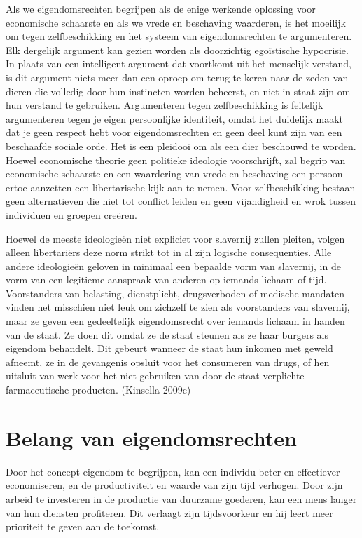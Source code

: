 \documentclass[
  a5paper,
  smalldemyvopaper,11pt,twoside,onecolumn,openright,extrafontsizes,
hidelinks]{memoir}
\begin{document}
Als we eigendomsrechten begrijpen als de enige werkende oplossing voor
economische schaarste en als we vrede en beschaving waarderen, is het
moeilijk om tegen zelfbeschikking en het systeem van eigendomsrechten te
argumenteren. Elk dergelijk argument kan gezien worden als doorzichtig
egoïstische hypocrisie. In plaats van een intelligent argument dat
voortkomt uit het menselijk verstand, is dit argument niets meer dan een
oproep om terug te keren naar de zeden van dieren die volledig door hun
instincten worden beheerst, en niet in staat zijn om hun verstand te
gebruiken. Argumenteren tegen zelfbeschikking is feitelijk argumenteren
tegen je eigen persoonlijke identiteit, omdat het duidelijk maakt dat je
geen respect hebt voor eigendomsrechten en geen deel kunt zijn van een
beschaafde sociale orde. Het is een pleidooi om als een dier beschouwd
te worden. Hoewel economische theorie geen politieke ideologie
voorschrijft, zal begrip van economische schaarste en een waardering van
vrede en beschaving een persoon ertoe aanzetten een libertarische kijk
aan te nemen. Voor zelfbeschikking bestaan geen alternatieven die niet
tot conflict leiden en geen vijandigheid en wrok tussen individuen en
groepen creëren.

Hoewel de meeste ideologieën niet expliciet voor slavernij zullen
pleiten, volgen alleen libertariërs deze norm strikt tot in al zijn
logische consequenties. Alle andere ideologieën geloven in minimaal een
bepaalde vorm van slavernij, in de vorm van een legitieme aanspraak van
anderen op iemands lichaam of tijd. Voorstanders van belasting,
dienstplicht, drugsverboden of medische mandaten vinden het misschien
niet leuk om zichzelf te zien als voorstanders van slavernij, maar ze
geven een gedeeltelijk eigendomsrecht over iemands lichaam in handen van
de staat. Ze doen dit omdat ze de staat steunen als ze haar burgers als
eigendom behandelt. Dit gebeurt wanneer de staat hun inkomen met geweld
afneemt, ze in de gevangenis opsluit voor het consumeren van drugs, of
hen uitsluit van werk voor het niet gebruiken van door de staat
verplichte farmaceutische producten. (Kinsella 2009c)

\section{Belang van eigendomsrechten}\label{belang-van-eigendomsrechten}

Door het concept eigendom te begrijpen, kan een individu beter en
effectiever economiseren, en de productiviteit en waarde van zijn tijd
verhogen. Door zijn arbeid te investeren in de productie van duurzame
goederen, kan een mens langer van hun diensten profiteren. Dit verlaagt
zijn tijdsvoorkeur en hij leert meer prioriteit te geven aan de
toekomst.
\end{document}
